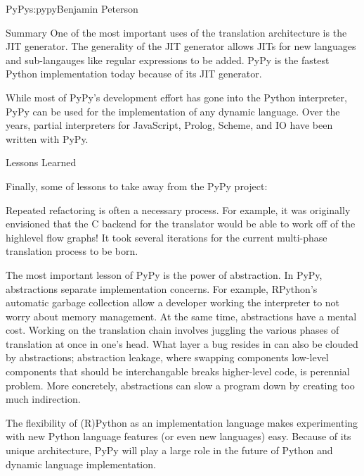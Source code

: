 \begin{aosachapter}{PyPy}{s:pypy}{Benjamin Peterson}
\begin{aosasect1}{Summary}
One of the most important uses of the translation architecture is the JIT
generator. The generality of the JIT generator allows JITs for new languages and
sub-langauges like regular expressions to be added. PyPy is the fastest Python
implementation today because of its JIT generator.

While most of PyPy's development effort has gone into the Python interpreter,
PyPy can be used for the implementation of any dynamic language. Over the years,
partial interpreters for JavaScript, Prolog, Scheme, and IO have been written
with PyPy.

\end{aosasect1}

\begin{aosasect1}{Lessons Learned}

Finally, some of lessons to take away from the PyPy project:

Repeated refactoring is often a necessary process. For example, it was
originally envisioned that the C backend for the translator would be able to
work off of the highlevel flow graphs! It took several iterations for the
current multi-phase translation process to be born.

The most important lesson of PyPy is the power of abstraction. In PyPy,
abstractions separate implementation concerns. For example, RPython's automatic
garbage collection allow a developer working the interpreter to not worry about
memory management. At the same time, abstractions have a mental cost. Working on
the translation chain involves juggling the various phases of translation at
once in one's head. What layer a bug resides in can also be clouded by
abstractions; abstraction leakage, where swapping components low-level
components that should be interchangable breaks higher-level code, is perennial
problem. More concretely, abstractions can slow a program down by creating too
much indirection.

The flexibility of (R)Python as an implementation language makes experimenting
with new Python language features (or even new languages) easy. Because of its
unique architecture, PyPy will play a large role in the future of Python and
dynamic language implementation.

\end{aosasect1}

\end{aosachapter}
